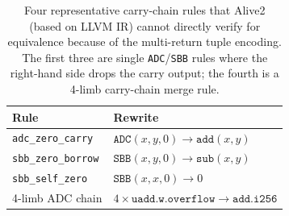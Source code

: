 \begin{table}[!h]
\centering
\caption{Four representative carry-chain rules that Alive2 (based on
LLVM IR) cannot directly verify for equivalence because of the multi-return
tuple encoding. The first three are single \texttt{ADC}/\texttt{SBB}
rules where the right-hand side drops the carry output; the fourth is a
4-limb carry-chain merge rule.}
\label{tab:cannot-express}
\footnotesize
\begin{tabular}{@{}ll@{}}
\toprule
Rule & Rewrite \\
\midrule
\texttt{adc\_zero\_carry}  & $\texttt{ADC}(x,y,0) \to \texttt{add}(x,y)$ \\
\texttt{sbb\_zero\_borrow} & $\texttt{SBB}(x,y,0) \to \texttt{sub}(x,y)$ \\
\texttt{sbb\_self\_zero}   & $\texttt{SBB}(x,x,0) \to 0$ \\
\midrule
4-limb ADC chain & $4 \times \texttt{uadd.w.overflow} \to \texttt{add.i256}$ \\
\bottomrule
\end{tabular}
\end{table}
